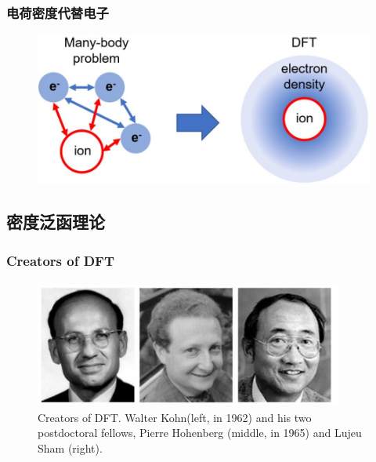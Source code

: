 {\frame
{
	\frametitle{电荷密度代替电子}
\begin{figure}[h!]
\centering
\vspace{3.5pt}
\includegraphics[height=0.45\textwidth,width=1.0\textwidth,viewport=0 0 950 440,clip]{Figures/Schematic-illustration-of-transforming-many_electron-system-to-electron-density.png}
\caption{\fontsize{6.0pt}{4.5pt}}
\label{Density-Particle}
\end{figure}
}

\subsection{密度泛函理论}       %
\frame
{
	\frametitle{\rm{Creators of DFT}}
\begin{figure}[h!]
\vskip 10pt
\centering
\includegraphics[height=1.65in,width=4.0in,viewport=0 0 1562 610,clip]{Figures/Creators_of_DFT.png}
\caption{\tiny \textrm{Creators of DFT. Walter Kohn(left, in 1962) and his two postdoctoral fellows, Pierre Hohenberg (middle, in 1965) and Lujeu Sham (right).}}%
\label{Creator_of_DFT}
\end{figure}
}

}
